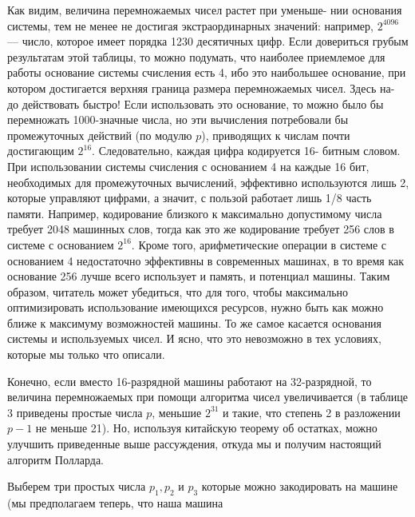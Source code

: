 Как видим, величина перемножаемых чисел растет при уменьше-\linebreak
нии основания системы, тем не менее не достигая экстраординарных\linebreak
значений: например, $2^{4096}$ --- число, которое имеет порядка 1230 десятичных цифр. Если довериться грубым результатам этой таблицы, то \linebreak
можно подумать, что наиболее приемлемое для работы основание системы счисления есть 4, ибо это наибольшее основание, при котором достигается верхняя граница размера перемножаемых чисел. Здесь на- \linebreak
\pagebreak
\newpage
\hspace{-14pt}до действовать быстро! Если использовать это основание, то можно
было бы перемножать 1000-значные числа, но эти вычисления 
потребовали бы промежуточных действий (по модулю $p$), приводящих к числам
почти достигающим $2^{16}$. Следовательно, каждая цифра кодируется 16-
битным словом. При использовании системы счисления с основанием
4 на каждые 16 бит, необходимых для промежуточных вычислений,
эффективно используются лишь 2, которые управляют цифрами, а 
значит, с пользой работает лишь 1/8 часть памяти. Например, 
кодирование близкого к максимально допустимому числа требует 2048 
машинных слов, тогда как это же кодирование требует 256 слов в системе
с основанием $2^{16}$. Кроме того, арифметические операции в системе с
основанием 4 недостаточно эффективны в современных машинах, в то
время как основание 256 лучше всего использует и память, и потенциал
машины. Таким образом, читатель может убедиться, что для того, 
чтобы максимально оптимизировать использование имеющихся ресурсов,
нужно быть как можно ближе к максимуму возможностей машины. То
же самое касается основания системы и используемых чисел. И ясно,
что это невозможно в тех условиях, которые мы только что описали.\par
  Конечно, если вместо 16-разрядной машины работают на 
32-разрядной, то величина перемножаемых при помощи алгоритма чисел 
увеличивается (в таблице 3 приведены простые числа $p$, меньшие $2^{31}$ и
такие, что степень 2 в разложении $p - 1$ не меньше 21). Но, используя
китайскую теорему об остатках, можно улучшить приведенные выше
рассуждения, откуда мы и получим настоящий алгоритм Полларда.\par
 Выберем три простых числа $p_{1}, p_{2}$ и $p_{3}$ которые можно 
закодировать на машине (мы предполагаем теперь, что наша машина 
